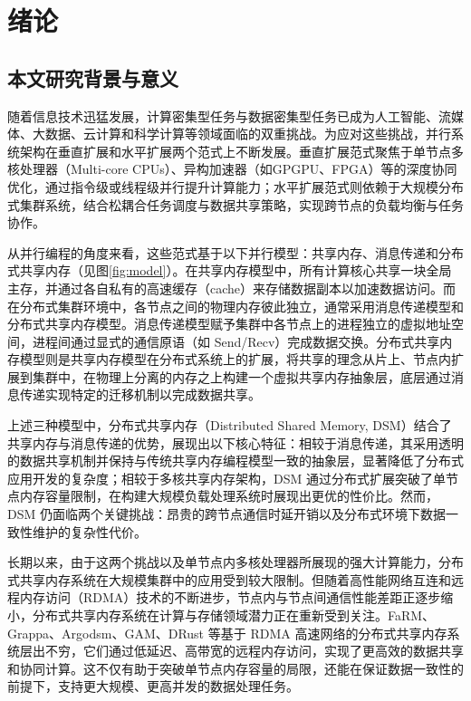\chapter{绪论}\label{chap:introduction}{
\section{本文研究背景与意义}
随着信息技术迅猛发展，计算密集型任务与数据密集型任务已成为人工智能、流媒体、大数据、云计算和科学计算等领域面临的双重挑战。为应对这些挑战，并行系统架构在垂直扩展和水平扩展两个范式上不断发展。垂直扩展范式聚焦于单节点多核处理器（Multi-core CPUs）、异构加速器（如GPGPU、FPGA）等的深度协同优化，通过指令级或线程级并行提升计算能力；水平扩展范式则依赖于大规模分布式集群系统，结合松耦合任务调度与数据共享策略，实现跨节点的负载均衡与任务协作。

从并行编程的角度来看，这些范式基于以下并行模型：共享内存、消息传递和分布式共享内存（见图\ref{fig:model}）。在共享内存模型中，所有计算核心共享一块全局主存，并通过各自私有的高速缓存（cache）来存储数据副本以加速数据访问。而在分布式集群环境中，各节点之间的物理内存彼此独立，通常采用消息传递模型和分布式共享内存模型。消息传递模型赋予集群中各节点上的进程独立的虚拟地址空间，进程间通过显式的通信原语（如 Send/Recv）完成数据交换。分布式共享内存模型则是共享内存模型在分布式系统上的扩展，将共享的理念从片上、节点内扩展到集群中，在物理上分离的内存之上构建一个虚拟共享内存抽象层，底层通过消息传递实现特定的迁移机制以完成数据共享。

上述三种模型中，分布式共享内存（Distributed Shared Memory, DSM）结合了共享内存与消息传递的优势，展现出以下核心特征：相较于消息传递，其采用透明的数据共享机制并保持与传统共享内存编程模型一致的抽象层，显著降低了分布式应用开发的复杂度；相较于多核共享内存架构，DSM 通过分布式扩展突破了单节点内存容量限制，在构建大规模负载处理系统时展现出更优的性价比。然而，DSM 仍面临两个关键挑战：昂贵的跨节点通信时延开销以及分布式环境下数据一致性维护的复杂性代价。

长期以来，由于这两个挑战以及单节点内多核处理器所展现的强大计算能力，分布式共享内存系统在大规模集群中的应用受到较大限制。但随着高性能网络互连和远程内存访问（RDMA）技术的不断进步，节点内与节点间通信性能差距正逐步缩小，分布式共享内存系统在计算与存储领域潜力正在重新受到关注。FaRM、Grappa、Argodsm、GAM、DRust 等基于 RDMA 高速网络的分布式共享内存系统层出不穷，它们通过低延迟、高带宽的远程内存访问，实现了更高效的数据共享和协同计算。这不仅有助于突破单节点内存容量的局限，还能在保证数据一致性的前提下，支持更大规模、更高并发的数据处理任务。

}

